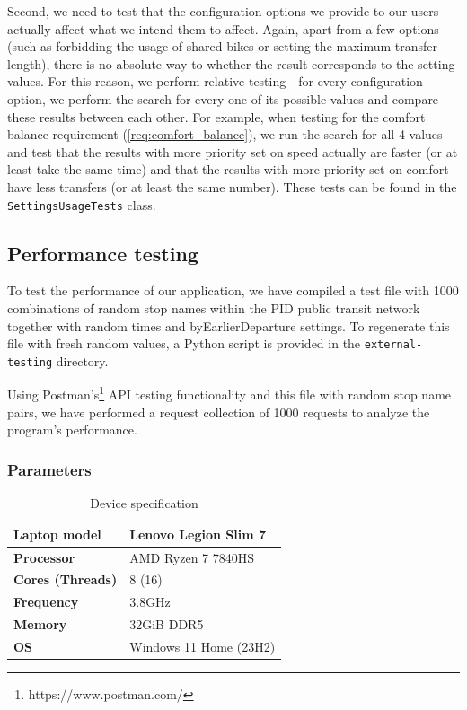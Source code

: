 Second, we need to test that the configuration options we provide to our users actually affect what we intend them to affect. Again, apart from a few options (such as forbidding the usage of shared bikes or setting the maximum transfer length), there is no absolute way to whether the result corresponds to the setting values. For this reason, we perform relative testing - for every configuration option, we perform the search for every one of its possible values and compare these results between each other. For example, when testing for the comfort balance requirement (\cref{req:comfort_balance}), we run the search for all 4 values and test that the results with more priority set on speed actually are faster (or at least take the same time) and that the results with more priority set on comfort have less transfers (or at least the same number). These tests can be found in the \texttt{SettingsUsageTests} class.

\subsection{Performance testing}

To test the performance of our application, we have compiled a test file with 1000 combinations of random stop names within the PID public transit network together with random times and byEarlierDeparture settings. To regenerate this file with fresh random values, a Python script is provided in the \texttt{external-testing} directory.

Using Postman's\footnote{https://www.postman.com/} API testing functionality and this file with random stop name pairs, we have performed a request collection of 1000 requests to analyze the program's performance.

\subsubsection{Parameters}

\begin{table}[h!]
\centering
\begin{tabularx}{\textwidth}{|l|X|}
\hline
\textbf{Laptop model} & Lenovo Legion Slim 7 \\
\hline
\textbf{Processor} & AMD Ryzen 7 7840HS \\
\hline
\textbf{Cores (Threads)} & 8 (16) \\
\hline
\textbf{Frequency} & 3.8GHz \\
\hline
\textbf{Memory} & 32GiB DDR5 \\
\hline
\textbf{OS} & Windows 11 Home (23H2) \\
\hline
\end{tabularx}
\caption{Device specification}
\label{tab:device_specification}
\end{table}

